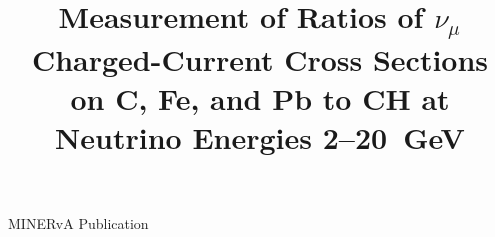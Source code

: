 \documentclass[aps,preprint,showpacs,superscriptaddress,linenumbers]{revtex4} %
\newcommand{\minerva}{MINERvA\xspace}  %
\begin{document}
\ifnum{}
\linenumbers %

\begin{flushright}
  {\large \minerva Publication \version} \\
\end{flushright}
\fi


\title{Measurement of Ratios of $\nu_{\mu}$ Charged-Current Cross Sections \\ on C, Fe, and Pb to CH at Neutrino Energies 2--20~GeV}


\newcommand{\deceased}{Deceased}
\end{document}
